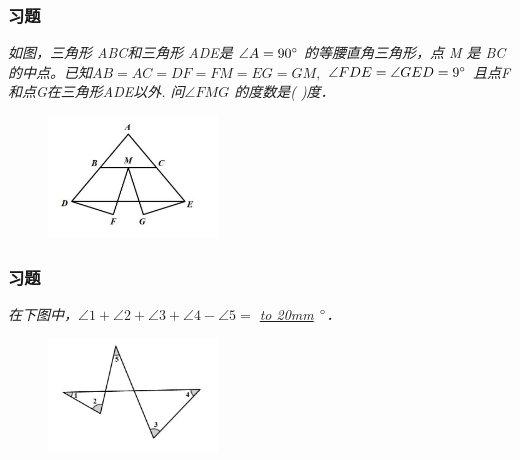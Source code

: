 \begin{frame}
    \frametitle{习题\theframecounter}
    \vspace*{-1cm}
    \textit{如图，三角形 ABC和三角形 ADE是 $\angle A=90\degree$ 的等腰直角三角形，点 M 是 BC 的中点。已知$AB=AC=DF=FM=EG=GM, $ $\angle FDE = \angle GED=9\degree$ 且点F和点G在三角形ADE以外. 问$\angle FMG$ 的度数是( )度．} 
    \begin{figure}[H] 
        \centering
        \includegraphics[width=0.4\textwidth]{./pics/Chapter_3/8.png}
    \end{figure}
\end{frame}

\begin{frame}
    \frametitle{习题\theframecounter}
    \vspace*{-1cm}
    \textit{在下图中，$\angle 1 + \angle 2 + \angle 3 + \angle 4 - \angle 5=$ \underline{\hbox to 20mm{}} $\degree$．} 
    \begin{figure}[H] 
        \centering
        \includegraphics[width=0.4\textwidth]{./pics/Chapter_3/9.png}
    \end{figure}
\end{frame}

